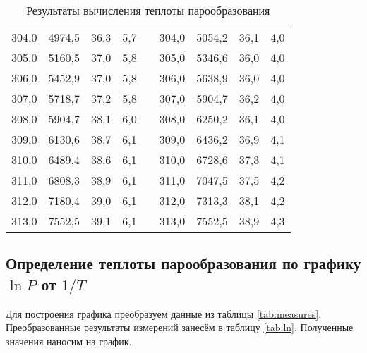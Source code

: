 \documentclass[a4paper,12pt]{article} %
\begin{document}
\begin{table}[H]
\begin{tabular}{|c|c|c|c|c|c|c|c|c|}
		304,0 & 4974,5 & 36,3 & 5,7 &  & 304,0 & 5054,2 & 36,1 & 4,0 \\ \cline{1-4} \cline{6-9} 
		305,0 & 5160,5 & 37,0 & 5,8 &  & 305,0 & 5346,6 & 36,0 & 4,0 \\ \cline{1-4} \cline{6-9} 
		306,0 & 5452,9 & 37,0 & 5,8 &  & 306,0 & 5638,9 & 36,0 & 4,0 \\ \cline{1-4} \cline{6-9} 
		307,0 & 5718,7 & 37,2 & 5,8 &  & 307,0 & 5904,7 & 36,2 & 4,0 \\ \cline{1-4} \cline{6-9} 
		308,0 & 5904,7 & 38,1 & 6,0 &  & 308,0 & 6250,2 & 36,1 & 4,0 \\ \cline{1-4} \cline{6-9} 
		309,0 & 6130,6 & 38,7 & 6,1 &  & 309,0 & 6436,2 & 36,9 & 4,1 \\ \cline{1-4} \cline{6-9} 
		310,0 & 6489,4 & 38,6 & 6,1 &  & 310,0 & 6728,6 & 37,3 & 4,1 \\ \cline{1-4} \cline{6-9} 
		311,0 & 6808,3 & 38,9 & 6,1 &  & 311,0 & 7047,5 & 37,5 & 4,2 \\ \cline{1-4} \cline{6-9} 
		312,0 & 7180,4 & 39,0 & 6,1 &  & 312,0 & 7313,3 & 38,1 & 4,2 \\ \cline{1-4} \cline{6-9} 
		313,0 & 7552,5 & 39,1 & 6,1 &  & 313,0 & 7552,5 & 38,9 & 4,3 \\ \cline{1-4} \cline{6-9} 
	\end{tabular}
	\caption{Результаты вычисления теплоты парообразования}
	\label{tab:par}
\end{table}

\subsection{Определение теплоты парообразования по графику $ \ln P $ от $ 1 / T $}

Для построения графика преобразуем данные из таблицы \ref{tab:measures}. Преобразованные результаты измерений занесём в таблицу \ref{tab:ln}. Полученные значения наносим на график.
\end{document}
